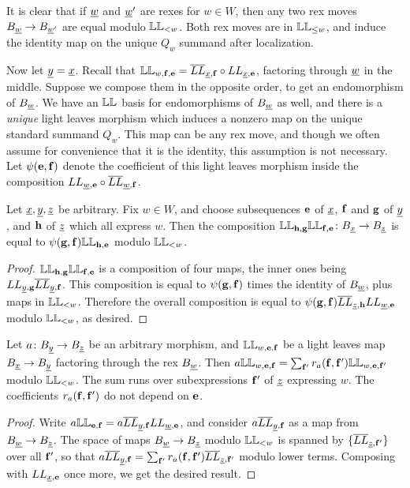 It is clear that if ${\underline{w}}$ and $\underline{w}'$ are rexes for $w \in W$, then any two rex moves $B_{\underline{w}} \rightarrow B_{\underline{w}'}$ are equal modulo $\mathbb{LL}_{< w}$. Both rex moves are in $\mathbb{LL}_{\le w}$, and induce the identity map on the unique $Q_w$ summand after localization.

Now let ${\underline{y}}={\underline{x}}$. Recall that $\mathbb{LL}_{w,{\mathbf f},{\mathbf e}} = \overline{LL}_{{\underline{x}},{\mathbf f}} \circ LL_{{\underline{x}},{\mathbf e}}$, factoring through ${\underline{w}}$ in the middle. Suppose we compose them in the opposite order, to get an
endomorphism of $B_{\underline{w}}$. We have an $\mathbb{LL}$ basis for endomorphisms of $B_{\underline{w}}$ as well, and there is a \emph{unique} light leaves morphism which induces a nonzero map on
the unique standard summand $Q_w$. This map can be any rex move, and though we often assume for convenience that it is the identity, this assumption is not necessary. Let $\psi({\mathbf e},{\mathbf f})$
denote the coefficient of this light leaves morphism inside the composition $LL_{{\underline{w}},{\mathbf e}} \circ \overline{LL}_{{\underline{w}},{\mathbf f}}$.

\begin{claim} Let ${\underline{x}},{\underline{y}},{\underline{z}}$ be arbitrary. Fix $w \in W$, and choose subsequences ${\mathbf e}$ of ${\underline{x}}$, ${\mathbf f}$ and ${\mathbf g}$ of ${\underline{y}}$, and ${\mathbf h}$ of ${\underline{z}}$ which all express $w$. Then the
composition $\mathbb{LL}_{{\mathbf h},{\mathbf g}} \mathbb{LL}_{{\mathbf f},{\mathbf e}} \colon B_{\underline{x}} \rightarrow B_{\underline{z}}$ is equal to $\psi({\mathbf g},{\mathbf f}) \mathbb{LL}_{{\mathbf h},{\mathbf e}}$ modulo $\mathbb{LL}_{< w}$. \end{claim}

\begin{proof} $\mathbb{LL}_{{\mathbf h},{\mathbf g}} \mathbb{LL}_{{\mathbf f},{\mathbf e}}$ is a composition of four maps, the inner ones being $LL_{{\underline{y}},{\mathbf g}} \overline{LL}_{{\underline{y}},{\mathbf f}}$. This composition is equal to $\psi({\mathbf g},{\mathbf f})$ times the
identity of $B_{{\underline{w}}}$, plus maps in $\mathbb{LL}_{< w}$. Therefore the overall composition is equal to $\psi({\mathbf g},{\mathbf f}) \overline{LL}_{{\underline{z}},{\mathbf h}} LL_{{\underline{w}},{\mathbf e}}$ modulo $\mathbb{LL}_{< w}$, as desired. \end{proof}

\begin{claim} Let $a \colon B_{\underline{y}} \rightarrow B_{\underline{z}}$ be an arbitrary morphism, and $\mathbb{LL}_{w,{\mathbf e},{\mathbf f}}$ be a light leaves map $B_{\underline{x}} \rightarrow B_{\underline{y}}$ factoring through the rex $B_{\underline{w}}$. Then $a \mathbb{LL}_{w,{\mathbf e},{\mathbf f}}
= \sum_{{\mathbf f}'} r_a({\mathbf f},{\mathbf f}') \mathbb{LL}_{w,{\mathbf e},{\mathbf f}'}$ modulo $\mathbb{LL}_{< w}$. The sum runs over subexpressions ${\mathbf f}'$ of ${\underline{z}}$ expressing $w$. The coefficients $r_a({\mathbf f},{\mathbf f}')$ do not depend on ${\mathbf e}$. \end{claim}

\begin{proof} Write $a \mathbb{LL}_{{\mathbf e},{\mathbf f}} = a \overline{LL}_{{\underline{y}},{\mathbf f}} LL_{{\underline{w}},{\mathbf e}}$, and consider $a \overline{LL}_{{\underline{y}},{\mathbf f}}$ as a map from $B_{\underline{w}} \rightarrow B_{\underline{z}}$. The space of maps $B_{\underline{w}} \rightarrow B_{\underline{z}}$ modulo
$\mathbb{LL}_{< w}$ is spanned by $\{ \overline{LL}_{{\underline{z}},{\mathbf f}'}\}$ over all ${\mathbf f}'$, so that $a \overline{LL}_{{\underline{y}},{\mathbf f}} = \sum_{{\mathbf f}'} r_a({\mathbf f},{\mathbf f}') \overline{LL}_{{\underline{z}},{\mathbf f}'}$ modulo lower terms. Composing with $LL_{{\underline{x}},{\mathbf e}}$
once more, we get the desired result. \end{proof}

